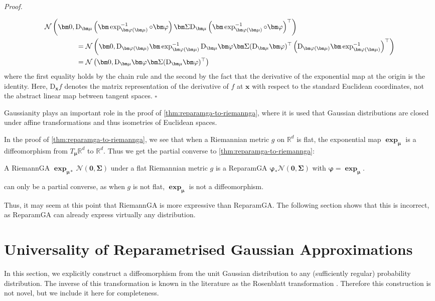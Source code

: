 \documentclass[runningheads,orivec]{llncs}
\newcommand{\R}{\mathbb R}
\newcommand{\Dev}{\mathrm D}
\newcommand{\inv}{^{-1}}
\newenvironment{proof}[1][Proof]{%
    \par\noindent\textit{#1. }%
    \ignorespaces
}{%
    \hfill$\square$ %
    \par
}
\begin{document}
\begin{proof}
    \begin{align*}
        &\mathcal N\left(\bm 0, \Dev_{\bm\mu}\left(\bm\exp_{\bm\varphi(\bm\mu)}\inv\circ\bm\varphi\right)\bm \Sigma \Dev_{\bm\mu}\left(\bm\exp_{\bm\varphi(\bm\mu)}\inv\circ\bm\varphi\right)^\top\right) \\
        &\hspace{4.5em}= \mathcal N\left(\bm 0, \Dev_{\bm\varphi(\bm\mu)}\bm\exp_{\bm\varphi(\bm\mu)}\inv\Dev_{\bm\mu}\bm\varphi\bm\Sigma(\Dev_{\bm\mu}\bm\varphi)^\top\left(\Dev_{\bm\varphi(\bm\mu)}\bm\exp_{\bm\varphi(\bm\mu)}\inv\right)^\top\right) \\
        &\hspace{4.5em}= \mathcal N\left(\bm 0, \Dev_{\bm\mu}\bm\varphi\bm\Sigma(\Dev_{\bm\mu}\bm\varphi)^\top\right)
    \end{align*}
    where the first equality holds by the chain rule and the second by the fact that the derivative of the exponential map at the origin is the identity. Here, $\Dev_{\bm x}f$ denotes the matrix representation of the derivative of $f$ at $\bm x$ with respect to the standard Euclidean coordinates, not the abstract linear map between tangent spaces.
\end{proof}

Gaussianity plays an important role in the proof of \cref{thm:reparamga-to-riemannga}, where it is used that Gaussian distributions are closed under affine transformations and thus isometries of Euclidean spaces.

In the proof of \cref{thm:reparamga-to-riemannga}, we see that when a Riemannian metric $g$ on $\R^d$ is flat, the exponential map $\bm\exp_{\bm\mu}$ is a diffeomorphism from $T_{\bm\mu}\R^d$ to $\R^d$. Thus we get the partial converse to \cref{thm:reparamga-to-riemannga}:
\begin{theorem}\label{thm:converse}
    A RiemannGA $\bm\exp_{\bm\mu*}\mathcal N(\bm 0,\bm\Sigma)$ under a flat Riemannian metric $g$ is a ReparamGA $\bm\varphi_*\mathcal N(\bm0,\bm\Sigma)$ with $\bm\varphi = \bm\exp_{\bm\mu}$.
\end{theorem}

 can only be a partial converse, as when $g$ is not flat, $\bm\exp_{\bm\mu}$ is not a diffeomorphism.

Thus, it may seem at this point that RiemannGA is more expressive than ReparamGA. The following section shows that this is incorrect, as ReparamGA can already express virtually any distribution.

\section{Universality of Reparametrised Gaussian Approximations}
In this section, we explicitly construct a diffeomorphism from the unit Gaussian distribution to any (sufficiently regular) probability distribution. The inverse of this transformation is known in the literature as the Rosenblatt transformation \cite{ditlevsen_structural_1996}. Therefore this construction is not novel, but we include it here for completeness.
\end{document}
